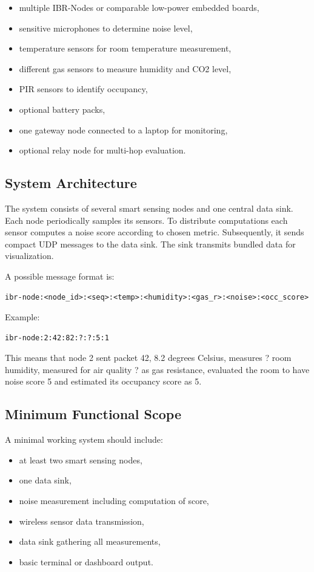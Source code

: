 \documentclass[11pt,a4paper]{article}
\newcommand{\projecttitle}[1]{\subsection*{#1}}
\begin{document}
\begin{itemize}
    \item multiple IBR-Nodes or comparable low-power embedded boards,
    \item sensitive microphones to determine noise level,
    \item temperature sensors for room temperature measurement,
    \item different gas sensors to measure humidity and CO2 level,
    \item PIR sensors to identify occupancy,
    \item optional battery packs,
    \item one gateway node connected to a laptop for monitoring,
    \item optional relay node for multi-hop evaluation.
\end{itemize}

\projecttitle{System Architecture}

The system consists of several smart sensing nodes and one central data sink. Each node periodically samples its sensors. To distribute computations each sensor computes a noise score according to chosen metric. Subsequently, it sends compact UDP messages to the data sink. The sink transmits bundled data for visualization.

A possible message format is:

\begin{verbatim}
ibr-node:<node_id>:<seq>:<temp>:<humidity>:<gas_r>:<noise>:<occ_score>
\end{verbatim}

Example:

\begin{verbatim}
ibr-node:2:42:82:?:?:5:1
\end{verbatim}

This means that node 2 sent packet 42, 8.2 degrees Celsius, measures ? room humidity, measured for air quality ? as gas resistance, evaluated the room to have noise score 5 and estimated its  occupancy score as 5.

\projecttitle{Minimum Functional Scope}

A minimal working system should include:

\begin{itemize}
    \item at least two smart sensing nodes,
    \item one data sink,
    \item noise measurement including computation of score,
    \item wireless sensor data transmission,
    \item data sink gathering all measurements,
    \item basic terminal or dashboard output.
\end{itemize}
\end{document}
